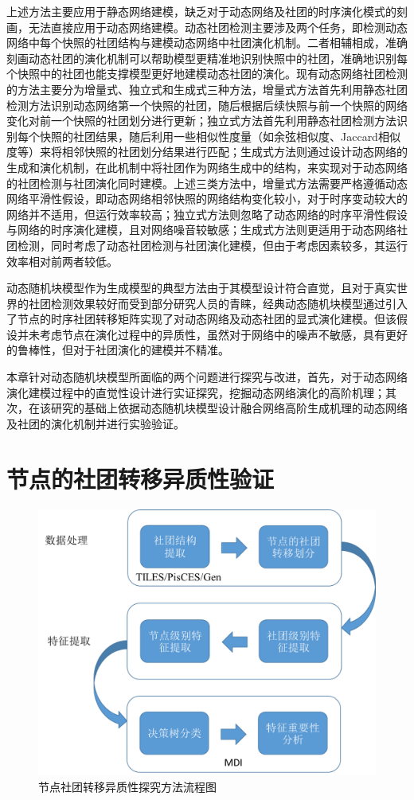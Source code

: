 上述方法主要应用于静态网络建模，缺乏对于动态网络及社团的时序演化模式的刻画，无法直接应用于动态网络建模。动态社团检测主要涉及两个任务，即检测动态网络中每个快照的社团结构与建模动态网络中社团演化机制。二者相辅相成，准确刻画动态社团的演化机制可以帮助模型更精准地识别快照中的社团，准确地识别每个快照中的社团也能支撑模型更好地建模动态社团的演化。现有动态网络社团检测的方法主要分为增量式、独立式和生成式三种方法，增量式方法首先利用静态社团检测方法识别动态网络第一个快照的社团，随后根据后续快照与前一个快照的网络变化对前一个快照的社团划分进行更新；独立式方法首先利用静态社团检测方法识别每个快照的社团结果，随后利用一些相似性度量（如余弦相似度、Jaccard相似度等）来将相邻快照的社团划分结果进行匹配；生成式方法则通过设计动态网络的生成和演化机制，在此机制中将社团作为网络生成中的结构，来实现对于动态网络的社团检测与社团演化同时建模。上述三类方法中，增量式方法需要严格遵循动态网络平滑性假设，即动态网络相邻快照的网络结构变化较小，对于时序变动较大的网络并不适用，但运行效率较高；独立式方法则忽略了动态网络的时序平滑性假设与网络的时序演化建模，且对网络噪音较敏感；生成式方法则更适用于动态网络社团检测，同时考虑了动态社团检测与社团演化建模，但由于考虑因素较多，其运行效率相对前两者较低。

动态随机块模型\cite{yang2011detecting}作为生成模型的典型方法由于其模型设计符合直觉，且对于真实世界的社团检测效果较好而受到部分研究人员的青睐，经典动态随机块模型通过引入了节点的时序社团转移矩阵实现了对动态网络及动态社团的显式演化建模。但该假设并未考虑节点在演化过程中的异质性，虽然对于网络中的噪声不敏感，具有更好的鲁棒性，但对于社团演化的建模并不精准。

本章针对动态随机块模型所面临的两个问题进行探究与改进，首先，对于动态网络演化建模过程中的直觉性设计进行实证探究，挖掘动态网络演化的高阶机理；其次，在该研究的基础上依据动态随机块模型设计融合网络高阶生成机理的动态网络及社团的演化机制并进行实验验证。

\section{节点的社团转移异质性验证}


\begin{figure}[!htbp]
	\setlength{\abovecaptionskip}{0pt} 
	\setlength{\belowcaptionskip}{10pt} 
        \centering
	\includegraphics[width=.8\textwidth]{figures/chap03/figure/modelChap3.png}
	\caption{节点社团转移异质性探究方法流程图}
	\label{fig.3.1}
\end{figure}

